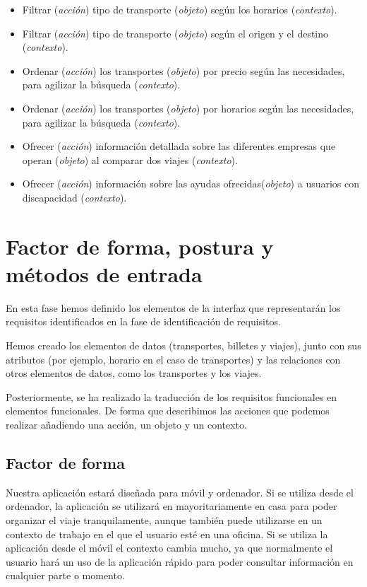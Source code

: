 \begin{itemize}
            (\textit{contexto}).
      \item Filtrar (\textit{acción}) tipo de transporte (\textit{objeto}) según los
            horarios (\textit{contexto}).
      \item Filtrar (\textit{acción}) tipo de transporte (\textit{objeto}) según el origen
            y el destino (\textit{contexto}).
      \item Ordenar (\textit{acción}) los transportes (\textit{objeto}) por precio según
            las necesidades, para agilizar la búsqueda (\textit{contexto}).
      \item Ordenar (\textit{acción}) los transportes (\textit{objeto}) por horarios según
            las necesidades, para agilizar la búsqueda (\textit{contexto}).
      \item Ofrecer (\textit{acción}) información detallada sobre las diferentes empresas
            que operan (\textit{objeto}) al comparar dos viajes (\textit{contexto}).
      \item Ofrecer (\textit{acción}) información sobre las ayudas
            ofrecidas(\textit{objeto}) a usuarios con discapacidad (\textit{contexto}).
\end{itemize}

\section{Factor de forma, postura y métodos de entrada}

En esta fase hemos definido los elementos de la interfaz que representarán los
requisitos identificados en la fase de identificación de requisitos.

Hemos creado los elementos de datos (transportes, billetes y viajes), junto con
sus atributos (por ejemplo, horario en el caso de transportes) y las relaciones
con otros elementos de datos, como los transportes y los viajes.

Posteriormente, se ha realizado la traducción de los requisitos funcionales en
elementos funcionales. De forma que describimos las acciones que podemos
realizar añadiendo una acción, un objeto y un contexto.

\subsection{Factor de forma}
Nuestra aplicación estará diseñada para móvil y ordenador. Si se utiliza desde
el ordenador, la aplicación se utilizará en mayoritariamente en casa para poder
organizar el viaje tranquilamente, aunque también puede utilizarse en un
contexto de trabajo en el que el usuario esté en una oficina. Si se utiliza la aplicación desde el
móvil el contexto cambia mucho, ya que normalmente el usuario hará un uso de la aplicación rápido para poder consultar información en cualquier parte o momento.

